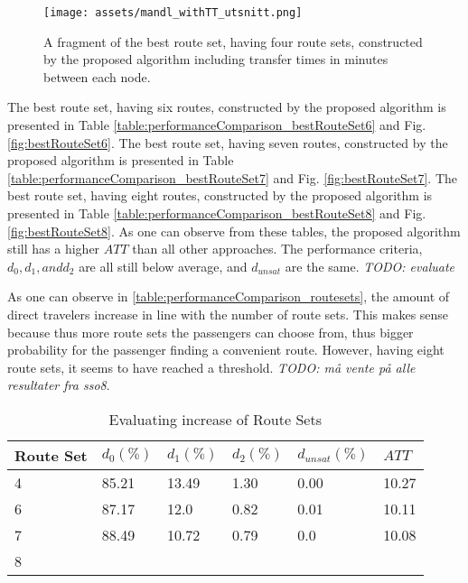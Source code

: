 \begin{figure}[H]
    \begin{center}
    \texttt{[image: assets/mandl\_withTT\_utsnitt.png]}
    \end{center}
    \caption{A fragment of the best route set, having four route sets, constructed by the proposed algorithm including transfer times in minutes between each node.}
    \label{fig:mandlWithTT} 
\end{figure}

The best route set, having six routes, constructed by the proposed algorithm is presented in Table \vref{table:performanceComparison_bestRouteSet6} and Fig. \vref{fig:bestRouteSet6}.  The best route set, having seven routes, constructed by the proposed algorithm is presented in Table \vref{table:performanceComparison_bestRouteSet7} and Fig. \vref{fig:bestRouteSet7}. The best route set, having eight routes, constructed by the proposed algorithm is presented in Table \vref{table:performanceComparison_bestRouteSet8} and Fig. \vref{fig:bestRouteSet8}. As one can observe from these tables, the proposed algorithm still has a higher $ATT$ than all other approaches. The performance criteria, $d_0, d_1, and d_{2}$ are all still below average, and $d_{unsat}$ are the same. \emph{\color{blue} TODO: evaluate}

As one can observe in \vref{table:performanceComparison_routesets}, the amount of direct travelers increase in line with the number of route sets. This makes sense because thus more route sets the passengers can choose from, thus bigger probability for the passenger finding a convenient route. However, having eight route sets, it seems to have reached a threshold. \emph{\color{blue} TODO: må vente på alle resultater fra sso8}.

 \begin{table}[H]
    \centering
    \begin{tabular}{|l||l|l|l|l|l|}
    \hline
    Route Set & $d_0(\%)$ & $d_1(\%)$ & $d_2(\%)$ & $d_{unsat}(\%)$ & $ATT$ \\
    \hline
    4 & 85.21 & 13.49 & 1.30 & 0.00 & 10.27\\
    6 & 87.17 & 12.0 & 0.82 & 0.01 & 10.11\\
    7 & 88.49 & 10.72 & 0.79 & 0.0 & 10.08\\
    8\\
    \hline
    \end{tabular}
    \caption {Evaluating increase of Route Sets}
    \label{table:performanceComparison_routesets}
\end{table}

